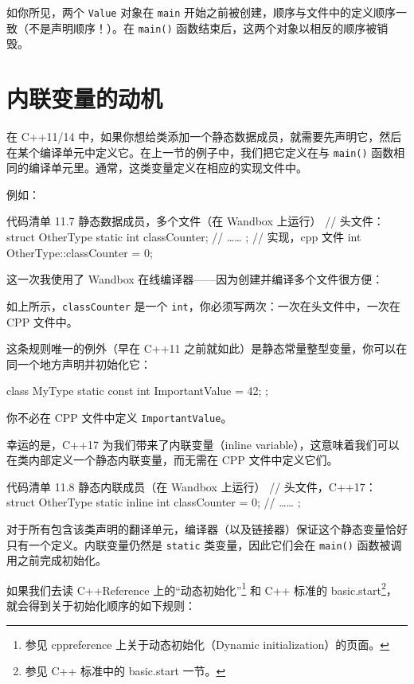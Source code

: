 如你所见，两个 \texttt{Value} 对象在 \texttt{main} 开始之前被创建，顺序与文件中的定义顺序一致（不是声明顺序！）。在 \texttt{main()} 函数结束后，这两个对象以相反的顺序被销毁。

\section{内联变量的动机}

在 C++11/14 中，如果你想给类添加一个静态数据成员，就需要先声明它，然后在某个编译单元中定义它。在上一节的例子中，我们把它定义在与 \texttt{main()} 函数相同的编译单元里。通常，这类变量定义在相应的实现文件中。

例如：

\begin{codeboxt}[cpp]{代码清单 11.7 静态数据成员，多个文件（在 Wandbox 上运行）}
// 头文件：
struct OtherType {
static int classCounter;
// ……
};
// 实现，cpp 文件
int OtherType::classCounter = 0;
\end{codeboxt}

这一次我使用了 Wandbox 在线编译器——因为创建并编译多个文件很方便：

如上所示，\texttt{classCounter} 是一个 \texttt{int}，你必须写两次：一次在头文件中，一次在 CPP 文件中。


这条规则唯一的例外（早在 C++11 之前就如此）是静态常量整型变量，你可以在同一个地方声明并初始化它：

\begin{codebox}[cpp]
class MyType {
static const int ImportantValue = 42;
};
\end{codebox}

你不必在 CPP 文件中定义 \texttt{ImportantValue}。

幸运的是，C++17 为我们带来了内联变量（inline variable），这意味着我们可以在类内部定义一个静态内联变量，而无需在 CPP 文件中定义它们。

\begin{codeboxt}[cpp]{代码清单 11.8 静态内联成员（在 Wandbox 上运行）}
// 头文件，C++17：
struct OtherType {
static inline int classCounter = 0;
// ……
};
\end{codeboxt}

对于所有包含该类声明的翻译单元，编译器（以及链接器）保证这个静态变量恰好只有一个定义。内联变量仍然是 \texttt{static} 类变量，因此它们会在 \texttt{main()} 函数被调用之前完成初始化。

如果我们去读 C++Reference 上的“动态初始化”\footnote{参见 cppreference 上关于动态初始化（Dynamic initialization）的页面。} 和 C++ 标准的 basic.start\footnote{参见 C++ 标准中的 basic.start 一节。}，就会得到关于初始化顺序的如下规则：

